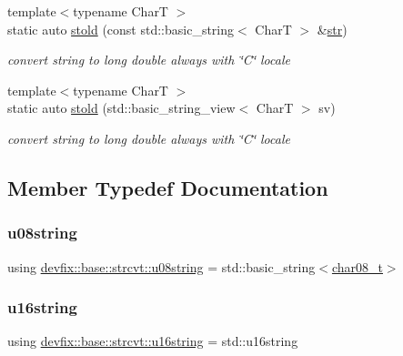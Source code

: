 \begin{DoxyCompactItemize}
{\footnotesize template$<$typename CharT $>$ }\\static auto \hyperlink{structdevfix_1_1base_1_1strcvt_a387c5ad278f568abb921df0ebac489c3}{stold} (const std\+::basic\+\_\+string$<$ CharT $>$ \&\hyperlink{structdevfix_1_1base_1_1strcvt_a469b02dcc803d1b740643d6809660851}{str})
\begin{DoxyCompactList}\small\item\em convert string to long double always with \char`\"{}\+C\char`\"{} locale \end{DoxyCompactList}\item 
{\footnotesize template$<$typename CharT $>$ }\\static auto \hyperlink{structdevfix_1_1base_1_1strcvt_acd3c558da236cbab738a9014df5979ac}{stold} (std\+::basic\+\_\+string\+\_\+view$<$ CharT $>$ sv)
\begin{DoxyCompactList}\small\item\em convert string to long double always with \char`\"{}\+C\char`\"{} locale \end{DoxyCompactList}\end{DoxyCompactItemize}


\subsection{Member Typedef Documentation}
\mbox{\label{structdevfix_1_1base_1_1strcvt_ad2a80b923d1d235cee3d4cd0bc560b64}} 
\subsubsection{\texorpdfstring{u08string}{u08string}}
{\footnotesize\ttfamily using \hyperlink{structdevfix_1_1base_1_1strcvt_ad2a80b923d1d235cee3d4cd0bc560b64}{devfix\+::base\+::strcvt\+::u08string} =  std\+::basic\+\_\+string$<$\hyperlink{strcvt_8h_a4af1e597c87b7893007a4ea68d648e91}{char08\+\_\+t}$>$}

\mbox{\label{structdevfix_1_1base_1_1strcvt_a33a324a669607cdb717d84bbfa1f844b}} 
\subsubsection{\texorpdfstring{u16string}{u16string}}
{\footnotesize\ttfamily using \hyperlink{structdevfix_1_1base_1_1strcvt_a33a324a669607cdb717d84bbfa1f844b}{devfix\+::base\+::strcvt\+::u16string} =  std\+::u16string}

